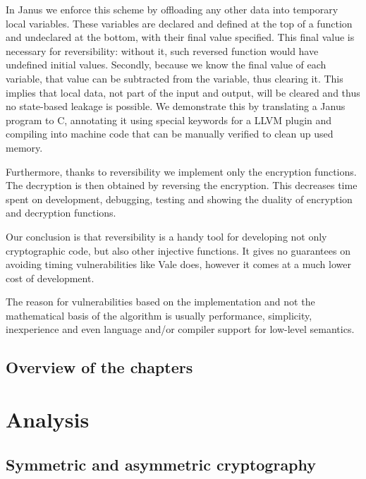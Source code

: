 \documentclass[a4paper,10pt,openright]{memoir}
\begin{document}
In Janus we enforce this scheme by offloading any other data into 
temporary local variables. These variables are declared and defined at 
the top of a function and undeclared at the bottom, with their final 
value specified. This final value is necessary for reversibility: 
without it, such reversed function would have undefined initial values. 
Secondly, because we know the final value of each variable, that value 
can be subtracted from the variable, thus clearing it. This implies 
that local data, not part of the input and output, will be cleared and 
thus no state-based leakage is possible. We demonstrate this by 
translating a Janus program to C, annotating it using special keywords 
for a LLVM plugin and compiling into machine code that can be manually 
verified to clean up used memory.

Furthermore, thanks to reversibility we implement only the encryption 
functions. The decryption is then obtained by reversing the encryption. 
This decreases time spent on development, debugging, testing and 
showing the duality of encryption and decryption functions.

Our conclusion is that reversibility is a handy tool for developing not 
only cryptographic code, but also other injective functions. It gives 
no guarantees on avoiding timing vulnerabilities like Vale does, 
however it comes at a much lower cost of development.



The reason for 
vulnerabilities based on the implementation and not the mathematical 
basis of the algorithm is usually performance, simplicity, inexperience 
and even language and/or compiler support for low-level semantics.






\section{Overview of the chapters}


\chapter{Analysis}


\section{Symmetric and asymmetric cryptography}
\end{document}
